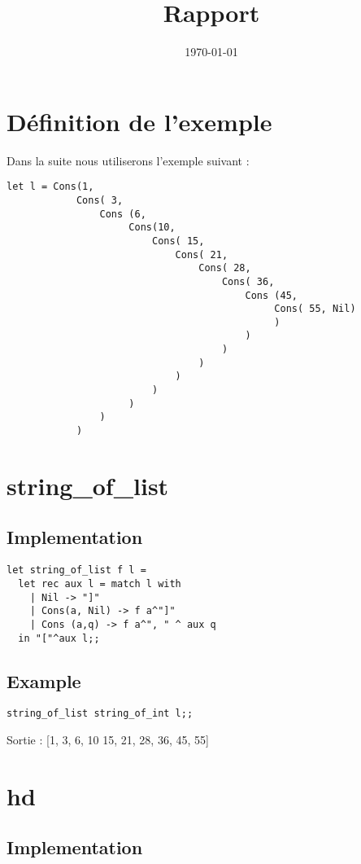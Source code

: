 \documentclass[12pt,french]{article}
\title{Rapport}
\date{\today}
\begin{document}
\maketitle

\section{Définition de l'exemple}
Dans la suite nous utiliserons l'exemple suivant :
\begin{verbatim}
let l = Cons(1,
            Cons( 3,
                Cons (6,
                     Cons(10,
                         Cons( 15,
                             Cons( 21,
                                 Cons( 28,
                                     Cons( 36,
                                         Cons (45,
                                              Cons( 55, Nil)
                                              )
                                         )
                                     )
                                 )
                             )
                         )
                     )
                )
            )
 \end{verbatim}

\newpage 
\section{string\_of\_list}

\subsection{Implementation}

\begin{verbatim}
let string_of_list f l =
  let rec aux l = match l with
    | Nil -> "]"
    | Cons(a, Nil) -> f a^"]"
    | Cons (a,q) -> f a^", " ^ aux q
  in "["^aux l;;
\end{verbatim}
\subsection{Example}
\begin{verbatim}
string_of_list string_of_int l;;
\end{verbatim}
Sortie :
[1, 3, 6, 10 15, 21, 28, 36, 45, 55]
\section{hd}

\subsection{Implementation}
\end{document}
